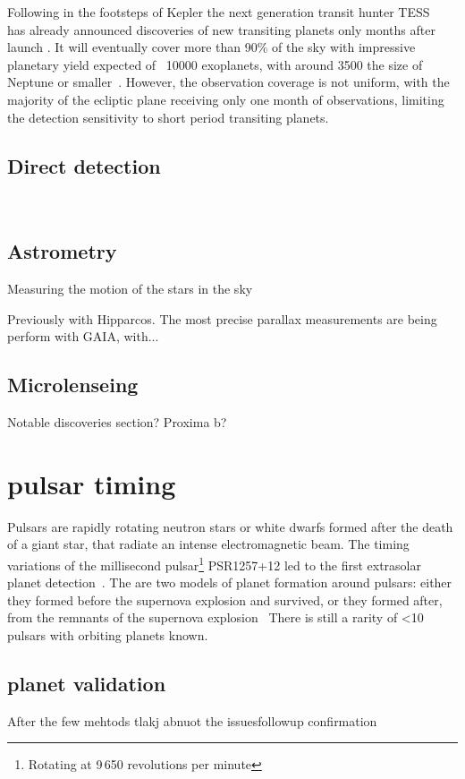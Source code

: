 Following in the footsteps of Kepler the next generation transit hunter TESS~\citep{ricker_transiting_2014} has already announced discoveries of new transiting planets only months after launch \citet{vanderspek_tess_2018, gandolfi_tesss_2018, huang_tess_2018}.
It will eventually cover more than 90\% of the sky with impressive planetary yield expected of ~10000 exoplanets, with around 3500 the size of Neptune or smaller~\citep{barclay_revisded_2018, huang_expected_2018}.
However, the observation coverage is not uniform, with the majority of the ecliptic plane receiving only one month of observations, limiting the detection sensitivity to short period transiting planets.


\subsection{Direct detection}
\
\subsection{Astrometry}

Measuring the motion of the stars in the sky

Previously with Hipparcos.
The most precise parallax measurements are being perform with GAIA, with...


\subsection{Microlenseing}


Notable discoveries section? Proxima b?  

\section{pulsar timing}

Pulsars are rapidly rotating neutron stars or white dwarfs formed after the death of a giant star, that radiate an intense electromagnetic beam. The timing variations of the millisecond pulsar\footnote{Rotating at 9\,650 revolutions per minute} PSR1257+12 led to the first extrasolar planet detection~\citet{wolszczan_planetary_1992}. The are two models of planet formation around pulsars: either they formed before the supernova explosion and survived, or they formed after, from the remnants of the supernova explosion~\citep{Starovoit_existence_2017}
There is still a rarity of  <10 pulsars with orbiting planets known.


\subsection{planet validation}
After the few mehtods tlakj abnuot the issuesfollowup confirmation


